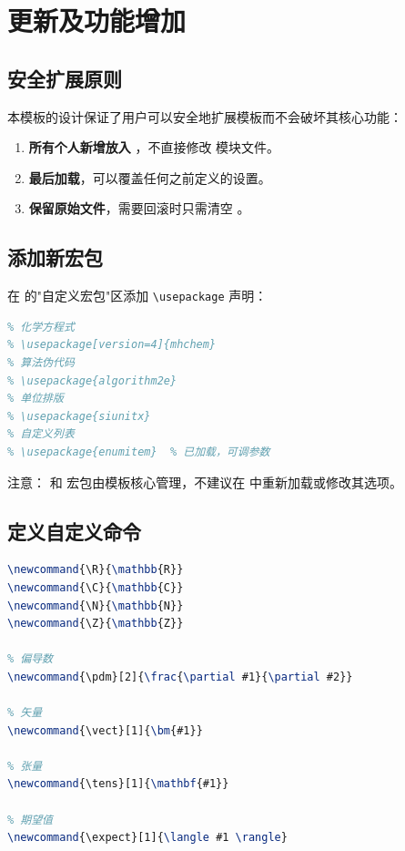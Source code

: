 \documentclass[../main-manual.tex]{subfiles}
\begin{document}
\cleardoublepage
\thispagestyle{empty}
 \songti
\setlength{\baselineskip}{24pt}
\RaggedRight
\setlength{\parindent}{2em}
\raggedbottom

\chapter{更新及功能增加} \label{ch:updates}

\section{安全扩展原则}

本模板的设计保证了用户可以安全地扩展模板而不会破坏其核心功能：

\begin{enumerate}[label=\textbf{原则\arabic*：}]
	\item \textbf{所有个人新增放入 }，不直接修改  模块文件。
	\item \textbf{ 最后加载}，可以覆盖任何之前定义的设置。
	\item \textbf{保留原始文件}，需要回滚时只需清空 。
\end{enumerate}

\section{添加新宏包}

在  的"自定义宏包"区添加 \verb|\usepackage| 声明：

\begin{lstlisting}[language=TeX, caption={添加常用宏包}]
% 文档内超链接（hyperref 已加载，但可调整设置）
% 化学方程式
% \usepackage[version=4]{mhchem}
% 算法伪代码
% \usepackage{algorithm2e}
% 单位排版
% \usepackage{siunitx}
% 自定义列表
% \usepackage{enumitem}  % 已加载，可调参数
\end{lstlisting}

注意： 和  宏包由模板核心管理，不建议在  中重新加载或修改其选项。

\section{定义自定义命令}

\begin{lstlisting}[language=TeX, caption={常用自定义命令}]
% 数学符号
\newcommand{\R}{\mathbb{R}}
\newcommand{\C}{\mathbb{C}}
\newcommand{\N}{\mathbb{N}}
\newcommand{\Z}{\mathbb{Z}}

% 偏导数
\newcommand{\pdm}[2]{\frac{\partial #1}{\partial #2}}

% 矢量
\newcommand{\vect}[1]{\bm{#1}}

% 张量
\newcommand{\tens}[1]{\mathbf{#1}}

% 期望值
\newcommand{\expect}[1]{\langle #1 \rangle}
\end{lstlisting}
\end{document}
